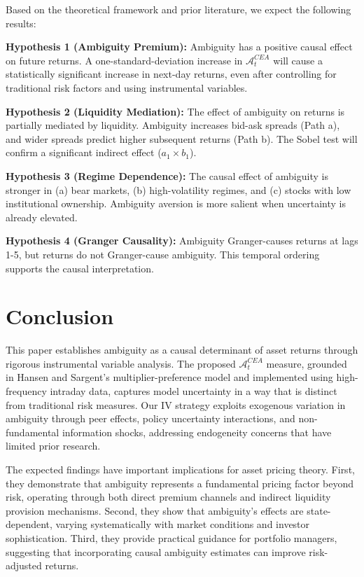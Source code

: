 \documentclass[preprint,12pt,authoryear]{elsarticle}
\begin{document}
Based on the theoretical framework and prior literature, we expect the following results:

\textbf{Hypothesis 1 (Ambiguity Premium):} Ambiguity has a positive causal effect on future returns. A one-standard-deviation increase in $\mathcal{A}^{CEA}_t$ will cause a statistically significant increase in next-day returns, even after controlling for traditional risk factors and using instrumental variables.

\textbf{Hypothesis 2 (Liquidity Mediation):} The effect of ambiguity on returns is partially mediated by liquidity. Ambiguity increases bid-ask spreads (Path a), and wider spreads predict higher subsequent returns (Path b). The Sobel test will confirm a significant indirect effect ($a_1 \times b_1$).

\textbf{Hypothesis 3 (Regime Dependence):} The causal effect of ambiguity is stronger in (a) bear markets, (b) high-volatility regimes, and (c) stocks with low institutional ownership. Ambiguity aversion is more salient when uncertainty is already elevated.

\textbf{Hypothesis 4 (Granger Causality):} Ambiguity Granger-causes returns at lags 1-5, but returns do not Granger-cause ambiguity. This temporal ordering supports the causal interpretation.

\section{Conclusion}

This paper establishes ambiguity as a causal determinant of asset returns through rigorous instrumental variable analysis. The proposed $\mathcal{A}^{CEA}_t$ measure, grounded in Hansen and Sargent's multiplier-preference model and implemented using high-frequency intraday data, captures model uncertainty in a way that is distinct from traditional risk measures. Our IV strategy exploits exogenous variation in ambiguity through peer effects, policy uncertainty interactions, and non-fundamental information shocks, addressing endogeneity concerns that have limited prior research.

The expected findings have important implications for asset pricing theory. First, they demonstrate that ambiguity represents a fundamental pricing factor beyond risk, operating through both direct premium channels and indirect liquidity provision mechanisms. Second, they show that ambiguity's effects are state-dependent, varying systematically with market conditions and investor sophistication. Third, they provide practical guidance for portfolio managers, suggesting that incorporating causal ambiguity estimates can improve risk-adjusted returns.
\end{document}
